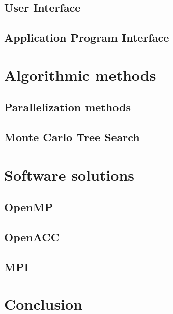 \documentclass[12pt]{article}
\begin{document}
	\subsection{User Interface}				\label{sec:ui}				
	\subsection{Application Program Interface}		\label{sec:api}	

\newpage

\section{Algorithmic methods}					\label{sec:algorithmicMethods}
	\subsection{Parallelization methods}			\label{sec:parallelization}			
	\subsection{Monte Carlo Tree Search}			\label{sec:mcts}				
\newpage

\section{Software solutions}					\label{sec:softwareSolutions}
	\subsection{OpenMP}					\label{sec:openmp}				
	\subsection{OpenACC}					\label{sec:openacc}			
	\subsection{MPI}						\label{sec:mpi}						
\newpage

\section{Conclusion}						\label{sec:conclusion}			
\newpage

%
%
\end{document}
